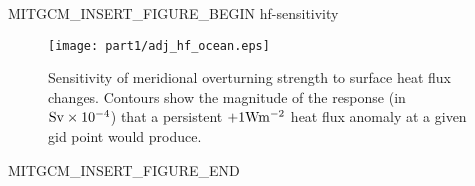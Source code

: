 \begin{rawhtml}MITGCM_INSERT_FIGURE_BEGIN hf-sensitivity\end{rawhtml}
\begin{figure}
  \begin{center}
   \texttt{[image: part1/adj\_hf\_ocean.eps]}
  \end{center}
\caption{Sensitivity of meridional overturning strength to surface heat flux
changes. Contours show the magnitude of the response (in ${\rm Sv }\times 10^{-4}$) that a persistent
$+1{\rm W}{\rm m}^{-2}$ heat flux anomaly at a given gid point would
produce.}
\label{fig:hf-sensitivity}
\end{figure}
\begin{rawhtml}MITGCM_INSERT_FIGURE_END\end{rawhtml}
